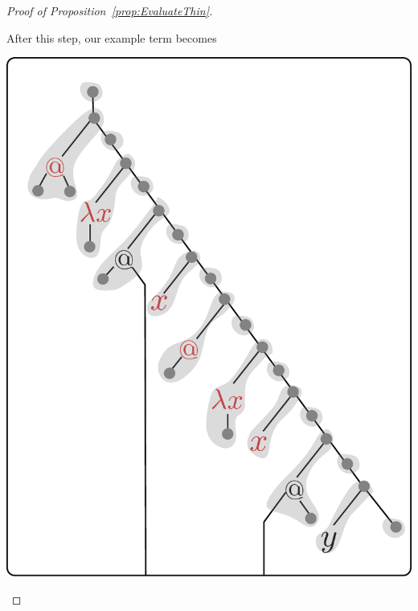 \begin{proof}[Proof of Proposition~\ref{prop:EvaluateThin}]
\begin{enumerate}
 After this step, our example term becomes    
\begin{center}
\includegraphics[scale=.3]{pictures/running-thin-4}
\end{center}


\end{enumerate}
\end{proof}
